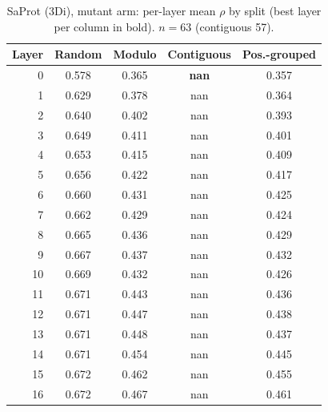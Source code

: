 \documentclass[11pt,a4paper]{article}
\begin{document}
\begin{table}[H]\centering\small

\caption{SaProt (3Di), mutant arm: per-layer mean $\rho$ by split (best layer per column in bold). $n=63$ (contiguous 57).}

\label{tab:S2SaProt3Dimutant}

\begin{tabular}{rcccc}

\toprule

Layer & Random & Modulo & Contiguous & Pos.-grouped \\

\midrule

0 & 0.578 & 0.365 & \textbf{nan} & 0.357 \\

1 & 0.629 & 0.378 & nan & 0.364 \\

2 & 0.640 & 0.402 & nan & 0.393 \\

3 & 0.649 & 0.411 & nan & 0.401 \\

4 & 0.653 & 0.415 & nan & 0.409 \\

5 & 0.656 & 0.422 & nan & 0.417 \\

6 & 0.660 & 0.431 & nan & 0.425 \\

7 & 0.662 & 0.429 & nan & 0.424 \\

8 & 0.665 & 0.436 & nan & 0.429 \\

9 & 0.667 & 0.437 & nan & 0.432 \\

10 & 0.669 & 0.432 & nan & 0.426 \\

11 & 0.671 & 0.443 & nan & 0.436 \\

12 & 0.671 & 0.447 & nan & 0.438 \\

13 & 0.671 & 0.448 & nan & 0.437 \\

14 & 0.671 & 0.454 & nan & 0.445 \\

15 & 0.672 & 0.462 & nan & 0.455 \\

16 & 0.672 & 0.467 & nan & 0.461 \\


\end{tabular}
\end{table}
\end{document}
